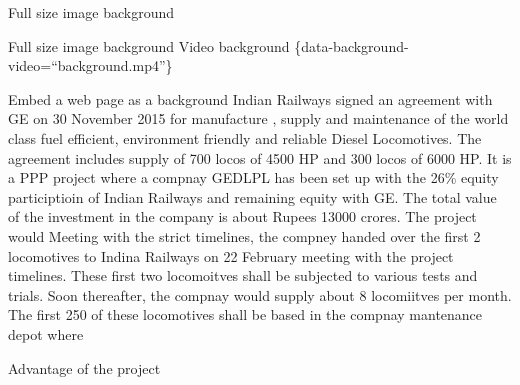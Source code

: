 \documentclass[
  ignorenonframetext,
]{beamer}
\begin{document}
\begin{frame}{Full size image background}
\protect\hypertarget{full-size-image-background}{}
\begin{block}{Full size image background}
\protect\hypertarget{full-size-image-background-1}{}
Video background \{data-background-video=``background.mp4''\}
\end{block}
\end{frame}

\begin{frame}{Embed a web page as a background}
\protect\hypertarget{embed-a-web-page-as-a-background}{}
Indian Railways signed an agreement with GE on 30 November 2015 for
manufacture , supply and maintenance of the world class fuel efficient,
environment friendly and reliable Diesel Locomotives. The agreement
includes supply of 700 locos of 4500 HP and 300 locos of 6000 HP. It is
a PPP project where a compnay GEDLPL has been set up with the 26\%
equity participtioin of Indian Railways and remaining equity with GE.
The total value of the investment in the company is about Rupees 13000
crores. The project would Meeting with the strict timelines, the compney
handed over the first 2 locomotives to Indina Railways on 22 February
meeting with the project timelines. These first two locomoitves shall be
subjected to various tests and trials. Soon thereafter, the compnay
would supply about 8 locomiitves per month. The first 250 of these
locomotives shall be based in the compnay mantenance depot where
\end{frame}

\begin{frame}{Advantage of the project}
\protect\hypertarget{advantage-of-the-project}{}
\end{frame}
\end{document}
